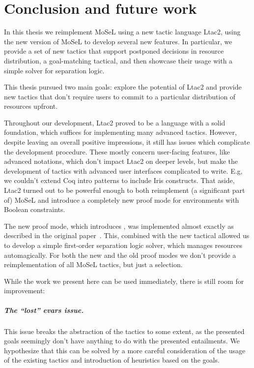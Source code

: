 \chapter{Conclusion and future work}

\vspace{-2em}
In this thesis we reimplement MoSeL using a new tactic language Ltac2, using the new version of MoSeL to develop several new features.
In particular, we provide a set of new tactics that support postponed decisions in resource distribution, a goal-matching tactical, and then showcase their usage with a simple solver for separation logic.

This thesis pursued two main goals: explore the potential of Ltac2 and provide new tactics that don't require users to commit to a particular distribution of resources upfront.

Throughout our development, Ltac2 proved to be a language with a solid foundation, which suffices for implementing many advanced tactics.
However, despite leaving an overall positive impressions, it still has issues which complicate the development procedure.
These mostly concern user-facing features, like advanced notations, which don't impact Ltac2 on deeper levels, but make the development of tactics with advanced user interfaces complicated to write.
E.g, we couldn't extend Coq intro patterns to include Iris constructs.
That aside, Ltac2 turned out to be powerful enough to both reimplement (a significant part of) MoSeL and introduce a completely new proof mode for environments with Boolean constraints.

The new proof mode, which introduces , was implemented almost exactly as described in the original paper~\cite{harlandResourceDistributionBooleanConstraints2003}.
This, combined with the new tactical  allowed us to develop a simple first-order separation logic solver, which manages resources automagically.
For both the new and the old proof modes we don't provide a reimplementation of all MoSeL tactics, but just a selection.

While the work we present here can be used immediately, there is still room for improvement:
\paragraph{The ``lost'' evars issue.}
  This issue breaks the abstraction of the tactics to some extent, as the presented goals seemingly don't have anything to do with the presented entailments.
  We hypothesize that this can be solved by a more careful consideration of the usage of the existing tactics and introduction of heuristics based on the goals.
